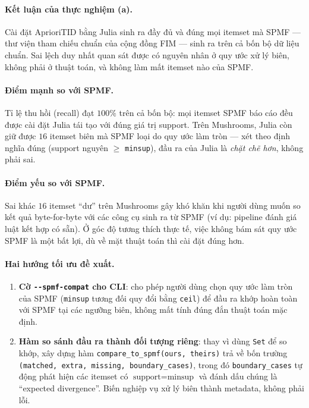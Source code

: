 \paragraph{Kết luận của thực nghiệm (a).} Cài đặt AprioriTID bằng Julia sinh ra đầy đủ và đúng mọi itemset mà SPMF --- thư viện tham chiếu chuẩn của cộng đồng FIM --- sinh ra trên cả bốn bộ dữ liệu chuẩn. Sai lệch duy nhất quan sát được có nguyên nhân ở quy ước xử lý biên, không phải ở thuật toán, và không làm mất itemset nào của SPMF.

\paragraph{Điểm mạnh so với SPMF.} Tỉ lệ thu hồi (recall) đạt $100\%$ trên cả bốn bộ: mọi itemset SPMF báo cáo đều được cài đặt Julia tái tạo với đúng giá trị support. Trên Mushrooms, Julia còn giữ được $16$ itemset biên mà SPMF loại do quy ước làm tròn --- xét theo định nghĩa đúng (support nguyên $\geq$ \texttt{minsup}), đầu ra của Julia là \emph{chặt chẽ hơn}, không phải sai.

\paragraph{Điểm yếu so với SPMF.} Sai khác $16$ itemset ``dư'' trên Mushrooms gây khó khăn khi người dùng muốn so kết quả byte-for-byte với các công cụ sinh ra từ SPMF (ví dụ: pipeline đánh giá luật kết hợp có sẵn). Ở góc độ tương thích thực tế, việc không bám sát quy ước SPMF là một bất lợi, dù về mặt thuật toán thì cài đặt đúng hơn.

\paragraph{Hai hướng tối ưu đề xuất.}
\begin{enumerate}
    \item \textbf{Cờ \texttt{-{}-spmf-compat} cho CLI}: cho phép người dùng chọn quy ước làm tròn của SPMF (\texttt{minsup} tương đối quy đổi bằng \texttt{ceil}) để đầu ra khớp hoàn toàn với SPMF tại các ngưỡng biên, không mất tính đúng đắn thuật toán mặc định.
    \item \textbf{Hàm so sánh đầu ra thành đối tượng riêng}: thay vì dùng \texttt{Set} để so khớp, xây dựng hàm \texttt{compare\_to\_spmf(ours, theirs)} trả về bốn trường \texttt{(matched, extra, missing, boundary\_cases)}, trong đó \texttt{boundary\_cases} tự động phát hiện các itemset có $\text{support} = \text{minsup}$ và đánh dấu chúng là ``expected divergence''. Biến nghiệp vụ xử lý biên thành metadata, không phải lỗi.
\end{enumerate}

